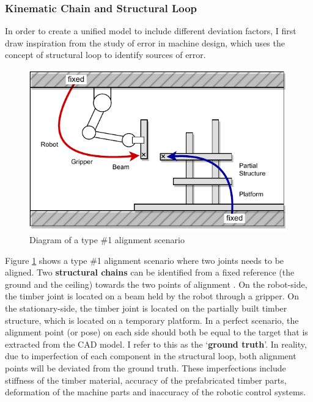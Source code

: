 \subsubsection{Kinematic Chain and Structural Loop}
\label{subsubsection:kinematic-chain-and-structural-loop}

In order to create a unified model to include different deviation factors, I first draw inspiration from the study of error in machine design, which uses the concept of structural loop to identify sources of error.

\begin{figure}[ht]
    \centering
    \includegraphics[width=0.99\textwidth]{images/09/Alignment Error Two Kinematic Chain.pdf}
    \caption{Diagram of a type \#1 alignment scenario}
    \label{fig:type-one-alignment-scenario}
\end{figure}

Figure \ref{fig:type-one-alignment-scenario} shows a type \#1 alignment scenario where two joints needs to be aligned. Two \textbf{structural chains} can be identified from a fixed reference (the ground and the ceiling) towards the two points of alignment \parencite{slocumPrecisionMachineDesign1992}. On the robot-side, the timber joint is located on a beam held by the robot through a gripper. On the stationary-side, the timber joint is located on the partially built timber structure, which is located on a temporary platform. In a perfect scenario, the alignment point (or pose) on each side should both be equal to the target that is extracted from the CAD model. I refer to this as the ‘\textbf{ground truth}’. In reality, due to imperfection of each component in the structural loop, both alignment points will be deviated from the ground truth. These imperfections include stiffness of the timber material, accuracy of the prefabricated timber parts, deformation of the machine parts and inaccuracy of the robotic control systems.

